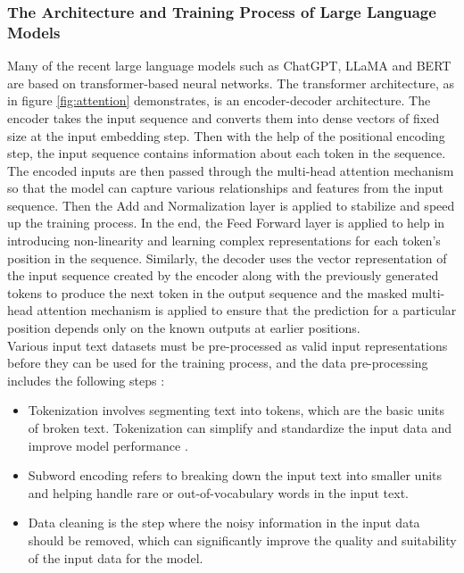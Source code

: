 \documentclass[runningheads]{llncs}
\begin{document}
\subsubsection{The Architecture and Training Process of Large Language Models}
\noindent \newline
Many of the recent large language models such as ChatGPT, LLaMA and BERT are based on transformer-based neural networks. The transformer architecture, as \cite{Vaswani17} in figure \ref{fig:attention} demonstrates, is an 
encoder-decoder architecture. The encoder takes the input sequence and converts them into dense vectors of fixed size at the input embedding step. Then with the 
help of the positional encoding step, the input sequence contains information about each token in the sequence. The encoded inputs are then passed through the multi-head attention mechanism so that the 
model can capture various relationships and features from the input sequence. Then the Add and Normalization layer is applied to stabilize and speed up the training process. In the end, the Feed Forward layer is 
applied to help in introducing non-linearity and learning complex representations for each token's position in the sequence. Similarly, the decoder uses the vector representation of the input sequence created
by the encoder along with the previously generated tokens to produce the next token in the output sequence and the masked multi-head attention mechanism is applied to ensure that the prediction for a particular position depends only on the known outputs at earlier positions. \\
\noindent \newline
Various input text datasets must be pre-processed as valid input representations before they can be used for the training process, and the data pre-processing includes the following steps \cite{Roum23}:
\begin{itemize}
  \item Tokenization involves segmenting text into tokens, which are the basic units of broken text. Tokenization can simplify and standardize the input data and improve model performance \cite{Devlin18}.
  \item Subword encoding refers to breaking down the input text into smaller units and helping handle rare or out-of-vocabulary words in the input text.
  \item Data cleaning is the step where the noisy information in the input data should be removed, which can significantly improve the quality and suitability of the input data for the model.
\end{itemize} 
\end{document}
